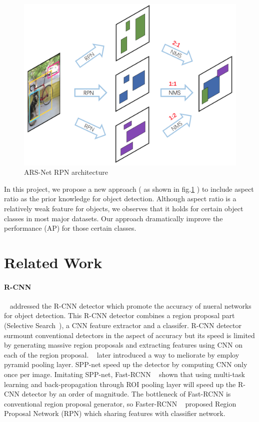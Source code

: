 \documentclass[10pt,twocolumn,letterpaper]{article}
\begin{document}
\begin{figure}[h]
\centering
\includegraphics[width=1\linewidth]{pic/ARS-archi-abstract.png}
\caption{ARS-Net RPN architecture}
\label{fig:ARS-archi}
\end{figure}

\par
In this project, we propose a new approach ( as shown in fig.\ref{fig:ARS-archi} ) to include aspect ratio as the prior knowledge for object detection. Although aspect ratio is a relatively weak feature for objects, we observes that it holds for certain object classes in most major datasets. Our approach dramatically improve the performance (AP) for those certain classes.

\section{Related Work}
	\label{sec:related-work}
\paragraph{R-CNN}
~\citet{RCNN} addressed the R-CNN detector which promote the accuracy of nueral networks for object detection. This R-CNN detector combines a region proposal part (Selective Search~\cite{SelectiveSearch}), a CNN feature extractor and a classifer. R-CNN detector surmount conventional detectors in the aspect of accuracy but its speed is limited by generating massive region proposals and extracting features using CNN on each of the region proposal. ~\citet{SPP} later introduced a way to meliorate by employ pyramid pooling layer. SPP-net speed up the detector by computing CNN only once per image. Imitating SPP-net, Fast-RCNN ~\cite{fastRCNN} shown that using multi-task learning and back-propagation through ROI pooling layer will speed up the R-CNN detector by an order of magnitude. The bottleneck of Fast-RCNN is conventional region proposal generator, so Faster-RCNN ~\cite{fasterRCNN} proposed Region Proposal Network (RPN) which sharing features with classifier network.
\end{document}
